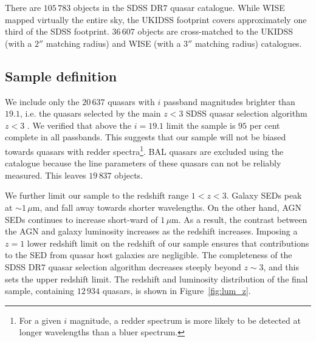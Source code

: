 There are $105\,783$ objects in the SDSS DR$7$ quasar catalogue. 
While WISE mapped virtually the entire sky, the UKIDSS footprint covers approximately one third of the SDSS footprint. 
$36\,607$ objects are cross-matched to the UKIDSS (with a $2''$ matching radius) and WISE (with a $3$$''$ matching radius) catalogues.

\subsection{Sample definition}

We include only the $20\,637$ quasars with $i$ passband magnitudes brighter than $19.1$, i.e. the quasars selected by the main $z<3$ SDSS quasar selection algorithm $z < 3$ \citep{richards02}. 
We verified that above the $i=19.1$ limit the sample is $95$ per cent complete in all passbands.
This suggests that our sample will not be biased towards quasars with redder spectra\footnote{For a given $i$ magnitude, a redder spectrum is more likely to be detected at longer wavelengths than a bluer spectrum.}. 
BAL quasars are excluded using the \citet{allen11} catalogue because the  line parameters of these quasars can not be reliably measured.
This leaves $19\,837$  objects. 

We further limit our sample to the redshift range $1 < z < 3$. 
Galaxy SEDs peak at $\sim1$\,$\mu$m, and fall away towards shorter wavelengths. 
On the other hand, AGN SEDs continues to increase short-ward of $1$\,$\mu$m. 
As a result, the contrast between the AGN and galaxy luminosity increases as the redshift increases.
Imposing a $z=1$ lower redshift limit on the redshift of our sample ensures that contributions to the SED from quasar host galaxies are negligible.
The completeness of the SDSS DR$7$ quasar selection algorithm decreases steeply beyond $z\sim3$, and this sets the upper redshift limit. 
The redshift and luminosity distribution of the final sample, containing $12\,934$ quasars, is shown in Figure~\ref{fig:lum_z}. 

